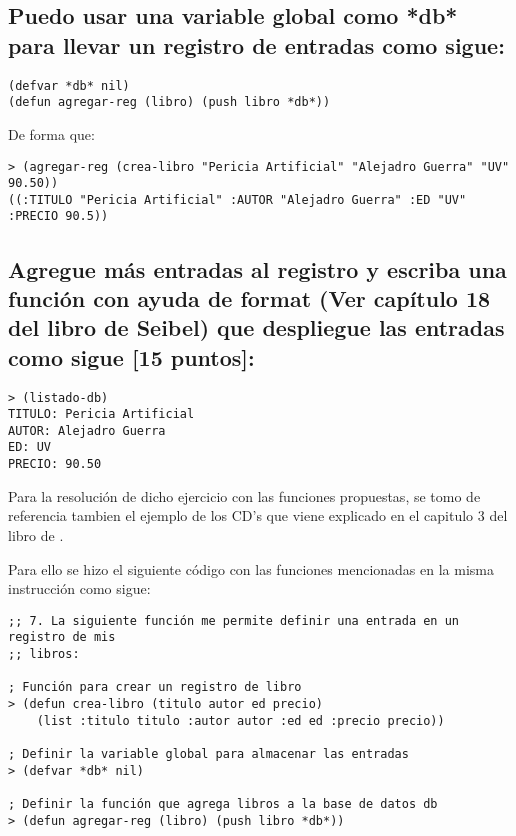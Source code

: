 \documentclass[11pt, letterpaper]{article}
\begin{document}
\subsection*{Puedo usar una variable global como *db* para llevar un registro de entradas como sigue:}

\begin{itemize}
	\begin{verbatim}
(defvar *db* nil)
(defun agregar-reg (libro) (push libro *db*))
	\end{verbatim}
\end{itemize}

De forma que: 

\begin{itemize}
	\begin{verbatim}
> (agregar-reg (crea-libro "Pericia Artificial" "Alejadro Guerra" "UV" 90.50))
((:TITULO "Pericia Artificial" :AUTOR "Alejadro Guerra" :ED "UV" :PRECIO 90.5))
	\end{verbatim}
\end{itemize}

\subsection*{Agregue más entradas al registro y escriba una función con ayuda de format (Ver capítulo 18 del libro de Seibel) que despliegue las entradas como sigue [15 puntos]:}

\begin{itemize}
	\begin{verbatim}
> (listado-db)
TITULO: Pericia Artificial
AUTOR: Alejadro Guerra
ED: UV
PRECIO: 90.50
	\end{verbatim}
\end{itemize}


Para la resolución de dicho ejercicio con las funciones propuestas, se tomo de referencia tambien el ejemplo de los CD's que viene explicado en el capitulo 3 del libro de \cite{seibel2006}.

Para ello se hizo el siguiente código con las funciones mencionadas en la misma instrucción como sigue:

\begin{itemize}
	\begin{verbatim}
;; 7. La siguiente función me permite definir una entrada en un registro de mis
;; libros:

; Función para crear un registro de libro
> (defun crea-libro (titulo autor ed precio)
    (list :titulo titulo :autor autor :ed ed :precio precio))

; Definir la variable global para almacenar las entradas
> (defvar *db* nil)

; Definir la función que agrega libros a la base de datos db
> (defun agregar-reg (libro) (push libro *db*))
	\end{verbatim}
\end{itemize}
\end{document}
